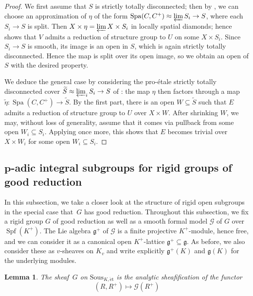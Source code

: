 \documentclass[11pt]{amsart}
\numberwithin{equation}{section}
\newtheorem{Lemma}[thm]{Lemma}
\theoremstyle{definition}
\theoremstyle{remark}
\newcommand{\Spa}{\operatorname{Spa}}
\newcommand{\et}{{\operatorname{\acute{e}t}}}
\newcommand{\Spf}{\operatorname{Spf}}
\newcommand{\mG}{\mathcal{G}}
\newcommand{\Sous}{\mathrm{Sous}}
\begin{document}
\begin{proof}
	We first assume that $S$ is strictly totally disconnected; then by , we can choose an approximation of $\eta$ of the form $\Spa(C,C^+)\approx \varprojlim S_i\to S$, where each $S_i\to S$ is split. Then $X\times \eta= \varprojlim X\times S_i$ in locally spatial diamonds; hence  shows that $V$ admits a reduction of structure group to $U$ on some $X\times S_i$. Since $S_i\to S$ is smooth, its image is an open in $S$, which is again strictly totally disconnected. Hence the map is split over its open image, so we obtain an open of $S$ with the desired property.
	
	We deduce the general case by considering the pro-\'etale strictly totally disconnected cover $\widetilde{S}\approx\varprojlim_i S_i\to S$ of : the map $\eta$ then factors through a map $\widetilde{\eta}\colon \Spa(C,C^+)\to \widetilde{S}$. By the first part, there is an open $W\subseteq \widetilde{S}$ such that $E$ admits a reduction of structure group to $U$ over $X\times W$. After shrinking $W$, we may, without loss of generality, assume that it comes via pullback from some open $W_i\subseteq S_i$. Applying  once more, this shows that $E$ becomes trivial over $X\times W_i$ for some open $W_i\subseteq S_i$.
\end{proof}

\subsection{$\boldsymbol{p}$-adic integral subgroups for rigid groups of good reduction }\label{s:integral-G}
In this subsection, we take a closer look at the structure of rigid open subgroups in the special case that~$G$ has good reduction.
Throughout this subsection, we fix a rigid group $G$ of good reduction as well as a smooth formal model $\mathcal G$ of $G$ over $\Spf(K^+)$. The Lie algebra $\mathfrak g^+$ of $\mathcal G$ is a finite projective $K^+$-module, hence free, and we can consider it as a canonical open $K^+$-lattice $\mathfrak g^+\subseteq \mathfrak g$. As before, we also consider these as $v$-sheaves on $K_v$ and write explicitly  $\mathfrak g^+(K)$ and $\mathfrak g(K)$ for the underlying  modules. 

\begin{Lemma}
	The sheaf\, $G$ on $\Sous_{K,\et}$ is the analytic sheafification of the functor 
	\[ (R,R^+)\longmapsto \mG(R^+)\]
\end{Lemma}
\end{document}
